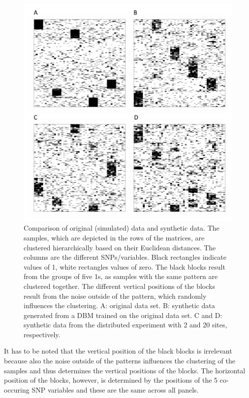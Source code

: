\documentclass[12pt]{article}
\begin{document}
 \begin{figure}[!hb]
   \centering
   \includegraphics[scale=1]{images/hclust.pdf}
   \caption{Comparison of original (simulated) data and synthetic data. The samples, which are depicted in the rows of the matrices, are clustered hierarchically based on their Euclidean distances. The columns are the different SNPs/variables. Black rectangles indicate values of 1, white rectangles values of zero. The black blocks result from the groups of five 1s, as samples with the same pattern are clustered together. The different vertical positions of the blocks result from the noise outside of the pattern, which randomly influences the clustering. A: original data set. B: synthetic data generated from a DBM trained on the original data set. C and D: synthetic data from the distributed experiment with 2 and 20 sites, respectively.}
   \label{fig:distclustersnps}
 \end{figure}

It has to be noted that the vertical position of the black blocks is irrelevant because also the noise outside of the patterns influences the clustering of the samples and thus determines the vertical positions of the blocks.
The horizontal position of the blocks, however, is determined by the positions of the 5 co-occuring SNP variables and these are the same across all panels.
\end{document}
